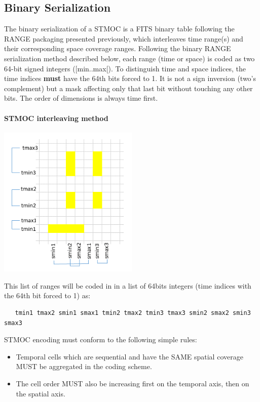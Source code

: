 \documentclass[11pt,a4paper]{ivoa}
\begin{document}
\subsection{Binary Serialization}
The binary serialization of a STMOC is a FITS binary table following
the RANGE packaging presented previously, which interleaves time range(s)
and their corresponding space coverage ranges. Following the binary
RANGE serialization method described below, each range (time or space)
is coded as two 64-bit signed integers ([min..max[). To distinguish time
and space indices, the time indices {\bf must} have the 64th bits forced
to 1. It is not a sign inversion (two's complement) but a mask affecting
only that last bit without touching any other bits.  The order of
dimensions is always time first.

\paragraph{STMOC interleaving method}
\begin{adjustbox}{center,caption={STMOC encoding with two independent
      numbering system},
    label={fig:stmocbin-encoding},nofloat=figure,vspace=\bigskipamount}
\includegraphics[width=0.5\textwidth]{STMOCbin.png}
\end{adjustbox}

\par\noindent
This list of ranges will be  coded in in a list of 64bits integers
(time indices with the 64th bit forced to 1) as:
\begin{verbatim}
   tmin1 tmax2 smin1 smax1 tmin2 tmax2 tmin3 tmax3 smin2 smax2 smin3 smax3
\end{verbatim}

STMOC encoding must conform to the following simple rules:
\begin{itemize}
\item{Temporal cells which are sequential and have the SAME
  spatial coverage MUST be aggregated in the coding scheme.}
\item{The cell order MUST also be increasing first on the
  temporal axis, then on the spatial axis.}
\end{itemize}
\end{document}
